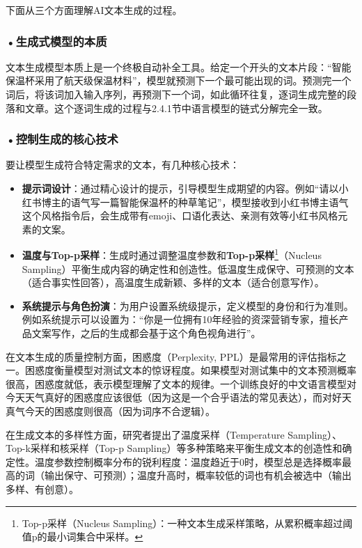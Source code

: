 下面从三个方面理解AI文本生成的过程。


\subsubsection*{\textbf{•生成式模型的本质}}

文本生成模型本质上是一个终极自动补全工具。给定一个开头的文本片段：“智能保温杯采用了航天级保温材料”，模型就预测下一个最可能出现的词。预测完一个词后，将该词加入输入序列，再预测下一个词，如此循环往复，逐词生成完整的段落和文章。这个逐词生成的过程与2.4.1节中语言模型的链式分解完全一致。
\subsubsection*{\textbf{•控制生成的核心技术}}

要让模型生成符合特定需求的文本，有几种核心技术：
\begin{itemize}
\item \textbf{提示词设计}：通过精心设计的提示，引导模型生成期望的内容。例如“请以小红书博主的语气写一篇智能保温杯的种草笔记”，模型接收到小红书博主语气这个风格指令后，会生成带有emoji、口语化表达、亲测有效等小红书风格元素的文案。
\item \textbf{温度与Top-p采样}：生成时通过调整温度参数和\textbf{Top-p采样}\footnote{Top-p采样（Nucleus Sampling）：一种文本生成采样策略，从累积概率超过阈值p的最小词集合中采样。}（Nucleus Sampling）平衡生成内容的确定性和创造性。低温度生成保守、可预测的文本（适合事实性回答），高温度生成新颖、多样的文本（适合创意写作）。
\item \textbf{系统提示与角色扮演}：为用户设置系统级提示，定义模型的身份和行为准则。例如系统提示可以设置为：“你是一位拥有10年经验的资深营销专家，擅长产品文案写作，之后的生成都会基于这个角色视角进行”。
\end{itemize}




在文本生成的质量控制方面，困惑度（Perplexity, PPL）是最常用的评估指标之一。困惑度衡量模型对测试文本的惊讶程度。如果模型对测试集中的文本预测概率很高，困惑度就低，表示模型理解了文本的规律。一个训练良好的中文语言模型对今天天气真好的困惑度应该很低（因为这是一个合乎语法的常见表达），而对好天真气今天的困惑度则很高（因为词序不合逻辑）。

在生成文本的多样性方面，研究者提出了温度采样（Temperature Sampling）、Top-k采样和核采样（Top-p Sampling）等多种策略来平衡生成文本的创造性和确定性。温度参数控制概率分布的锐利程度：温度趋近于0时，模型总是选择概率最高的词（输出保守、可预测）；温度升高时，概率较低的词也有机会被选中（输出多样、有创意）。

